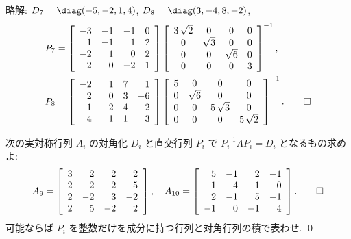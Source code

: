 \documentclass[12pt,twoside]{jarticle}
\newcommand\commentout[1]{#1}
\newcommand\commentout[1]{}
\begin{document}
\commentout{
\noindent
略解: $D_7=\diag(-5,-2,1,4)$, $D_8=\diag(3,-4,8,-2)$, 
\begin{align*}
  &
  P_7 = 
  \left[ 
    \begin{array}{rrrr}
      -3 & -1 & -1 & 0 \\
      1 & -1 & 1 & 2 \\
      -2 & 1 & 0 & 2 \\
      2 & 0 & -2 & 1
    \end{array}
  \right]
  \left[ 
    \begin{array}{cccr}
      3\,\sqrt {2} & 0 & 0 & 0 \\
      0 & \sqrt {3} & 0 & 0 \\
      0 & 0 & \sqrt {6} & 0 \\
      0 & 0 & 0 & 3
    \end{array}
  \right]^{-1},
  \\ &
  P_8 =
  \left[ 
    \begin{array}{rrrr}
      -2 & 1 & 7 & 1 \\
      2 & 0 & 3 & -6 \\
      1 & -2 & 4 & 2 \\
      4 & 1 & 1 & 3
    \end{array}
  \right]
  \left[ 
    \begin{array}{rccc}
      5 & 0 & 0 & 0 \\
      0 & \sqrt {6} & 0 & 0 \\
      0 & 0 & 5\,\sqrt {3} & 0 \\
      0 & 0 & 0 & 5\,\sqrt {2}
    \end{array}
  \right]^{-1}.
  \qed
\end{align*}
}


\begin{question}
\label{q:ars-5}
  次の実対称行列 $A_i$ の対角化 $D_i$ と直交行列 $P_i$ で $P_i^{-1}AP_i=D_i$ 
  となるもの求めよ:
  \begin{equation*}
    A_9 =
    \left[ 
      \begin{array}{rrrr}
        3 & 2 & 2 & 2 \\
        2 & 2 & -2 & 5 \\
        2 & -2 & 3 & -2 \\
        2 & 5 & -2 & 2
      \end{array}
    \right],
    \quad
    A_{10} =
    \left[ 
      \begin{array}{rrrr}
        5 & -1 & 2 & -1 \\
        -1 & 4 & -1 & 0 \\
        2 & -1 & 5 & -1 \\
        -1 & 0 & -1 & 4
      \end{array}
    \right].
    \qed
  \end{equation*}
  可能ならば $P_i$ を整数だけを成分に持つ行列と対角行列の積で表わせ.
  \qed
\end{question}
\end{document}
